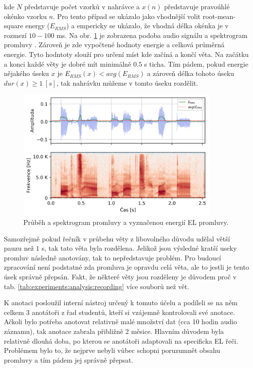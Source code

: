 \noindent kde $N$ představuje počet vzorků v nahrávce a $x(n)$ představuje pravoúhlé okénko vzorku $n$. Pro tento případ se ukázalo jako vhodnější volit root-mean-square energy ($E_{RMS}$) a empericky se ukázalo, že vhodná délka okénka je v rozmezí $10 - 100$ ms. Na obr. \ref{fig:experiments:analysis:el_speech} je zobrazena podoba audio signálu a spektrogram promluvy \textit{}. Zároveň je zde vypočtené hodnoty energie a celková průměrná energie. Tyto hodntoty slouží pro určení míst kde začíná a končí věta. Na začátku a konci každé věty je dobré mít minimálně $0.5$ s ticha. Tím pádem, pokud energie nějakého úseku $x$ je $E_{RMS}(x) < avg(E_{RMS})$ a zároveň délka tohoto úseku $dur(x) \geq 1\ [s]$, tak nahrávku můžeme v tomto úseku rozdělit.

\begin{figure}[hbpt]
  \centering
  \includegraphics[width=0.9\textwidth]{./ch4-experiments/img/energy_spec_el.png}
  \caption{Průběh a spektrogram promluvy a vyznačenou energií EL promluvy.}
  \label{fig:experiments:analysis:el_speech}
\end{figure}

Samozřejmě pokud řečník v průbehu věty z libovolného důvodu udělal větší pauzu než $1$ s, tak tato věta byla rozdělena. Jelikož jsou výsledné kratší useky promluv následně anotovány, tak to nepředstavuje problém. Pro budoucí zpracování není podstatné zda promluva je opravdu celá věta, ale to jestli je tento úsek správně přepsán. Fakt, že některé věty jsou rozděleny je důvodem proč v tab. \ref{tab:experiments:analysis:recording} více souborů než vět.

K anotaci posloužil interní nástroj určený k tomuto účelu a podíleli se na něm celkem 3 anotátoři z řad studentů, kteří si vzájemně kontrolovali své anotace. Ačkoli bylo potřeba anotovat relativně malé množství dat (cca 10 hodin audio záznamu), tak anotace zabrala přibližně 2 měsice. Hlavním důvodem byla relativně dlouhá doba, po kterou se anotátoři adaptovali na specificka EL řeči. Problémem bylo to, že nejprve nebyli vůbec schopni poruzumnět obsahu promluvy a tím pádem jej správně přepsat.


